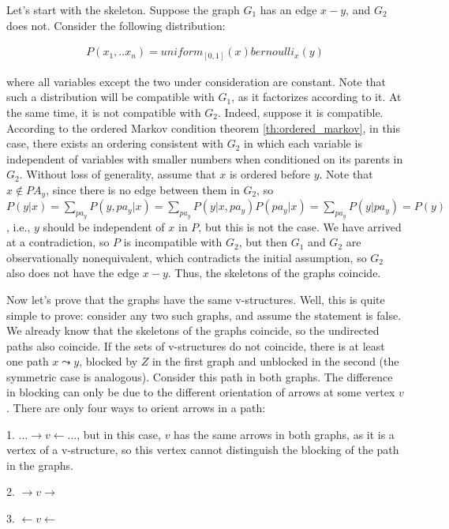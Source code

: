 \documentclass[fleqn]{article}
\numberwithin{equation}{section}
\numberwithin{theorem}{section}
\numberwithin{figure}{section}
\numberwithin{lemma}{section}
\numberwithin{corollary}{section}
\begin{document}
Let's start with the skeleton. Suppose the graph \( G_1 \) has an edge \( x-y \), and \( G_2 \) does not. Consider the following distribution:

\begin{align}
	P(x_1,..x_n) = uniform_{[0,1]}(x)bernoulli_x(y)
\end{align}

where all variables except the two under consideration are constant. Note that such a distribution will be compatible with \( G_1 \), as it factorizes according to it. At the same time, it is not compatible with \( G_2 \). Indeed, suppose it is compatible. According to the ordered Markov condition theorem \ref{th:ordered_markov}, in this case, there exists an ordering consistent with \( G_2 \) in which each variable is independent of variables with smaller numbers when conditioned on its parents in \( G_2 \). Without loss of generality, assume that \( x \) is ordered before \( y \). Note that \( x \notin PA_y \), since there is no edge between them in \( G_2 \), so \( P(y|x) = \sum_{pa_y} P(y, pa_y|x) = \sum_{pa_y} P(y|x, pa_y) P(pa_y|x) = \sum_{pa_y} P(y|pa_y) = P(y) \), i.e., \( y \) should be independent of \( x \) in \( P \), but this is not the case. We have arrived at a contradiction, so \( P \) is incompatible with \( G_2 \), but then \( G_1 \) and \( G_2 \) are observationally nonequivalent, which contradicts the initial assumption, so \( G_2 \) also does not have the edge \( x-y \). Thus, the skeletons of the graphs coincide.

Now let's prove that the graphs have the same v-structures. Well, this is quite simple to prove: consider any two such graphs, and assume the statement is false. We already know that the skeletons of the graphs coincide, so the undirected paths also coincide. If the sets of v-structures do not coincide, there is at least one path \( x \leadsto y \), blocked by \( Z \) in the first graph and unblocked in the second (the symmetric case is analogous). Consider this path in both graphs. The difference in blocking can only be due to the different orientation of arrows at some vertex \( v \). There are only four ways to orient arrows in a path:

1. \( ...\rightarrow v \leftarrow ... \), but in this case, \( v \) has the same arrows in both graphs, as it is a vertex of a v-structure, so this vertex cannot distinguish the blocking of the path in the graphs.

2. \( \rightarrow v \rightarrow \)

3. \( \leftarrow v \leftarrow \)
\end{document}

